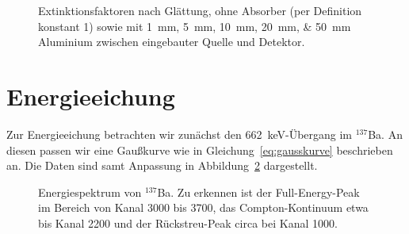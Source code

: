 \documentclass[11pt, ngerman, fleqn, DIV=15, headinclude, BCOR=2cm]{scrreprt}
\begin{document}
\begin{figure}[htbp]
    \centering
    \caption{%
        Extinktionsfaktoren nach Glättung, ohne Absorber (per Definition
        konstant 1) sowie mit \SIlist{1;5;10;20;50}{\milli\meter} Aluminium
        zwischen eingebauter Quelle und Detektor.
    }
    \label{fig:extinktion}
\end{figure}


\section{Energieeichung}

Zur Energieeichung betrachten wir zunächst den
\SI{662}{\kilo\electronvolt}-Übergang im ${}^{137}$Ba. An diesen passen wir
eine Gaußkurve wie in Gleichung~\eqref{eq:gausskurve} beschrieben an. Die Daten
sind samt Anpassung in Abbildung~\ref{fig:eichung_137Ba} dargestellt.

\begin{figure}[htbp]
    \centering
    \caption{%
        Energiespektrum von ${}^{137}$Ba. Zu erkennen ist der Full-Energy-Peak
        im Bereich von Kanal 3000 bis 3700, das Compton-Kontinuum etwa bis
        Kanal 2200 und der Rückstreu-Peak circa bei Kanal 1000.
    }
    \label{fig:eichung_137Ba}
\end{figure}
 
\end{document}
